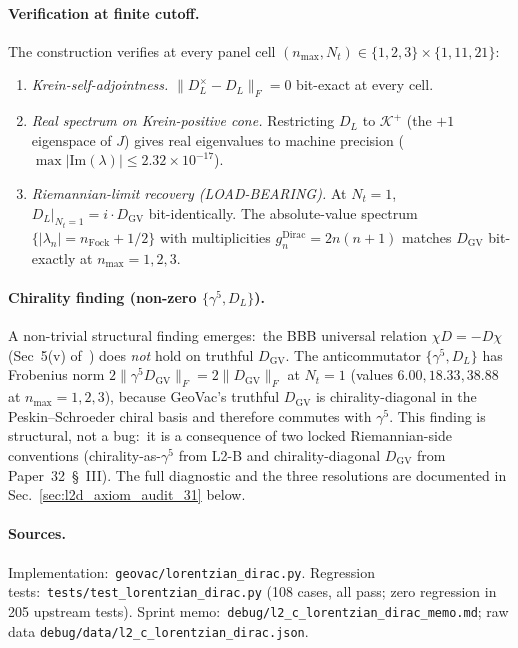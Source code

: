 \documentclass[11pt]{article}
\begin{document}
\paragraph{Verification at finite cutoff.}
The construction verifies at every panel cell $(n_{\max}, N_t) \in
\{1, 2, 3\} \times \{1, 11, 21\}$:
\begin{enumerate}\setlength{\itemsep}{2pt}
\item \emph{Krein-self-adjointness.}  $\|D_L^\times - D_L\|_F = 0$
bit-exact at every cell.
\item \emph{Real spectrum on Krein-positive cone.}  Restricting $D_L$
to $\mathcal{K}^+$ (the $+1$ eigenspace of $J$) gives real eigenvalues
to machine precision ($\max |\mathrm{Im}(\lambda)| \le 2.32 \times
10^{-17}$).
\item \emph{Riemannian-limit recovery (LOAD-BEARING).}  At $N_t = 1$,
$D_L|_{N_t = 1} = i \cdot D_{\mathrm{GV}}$ bit-identically.  The
absolute-value spectrum $\{|\lambda_n| = n_{\mathrm{Fock}} + 1/2\}$
with multiplicities $g_n^{\mathrm{Dirac}} = 2 n (n+1)$ matches
$D_{\mathrm{GV}}$ bit-exactly at $n_{\max} = 1, 2, 3$.
\end{enumerate}

\paragraph{Chirality finding (non-zero $\{\gamma^5, D_L\}$).}
A non-trivial structural finding emerges:\ the BBB universal
relation $\chi D = -D\chi$ (Sec~5(v) of~\cite{bizi_brouder_besnard2018})
does \emph{not} hold on truthful $D_{\mathrm{GV}}$.  The
anticommutator $\{\gamma^5, D_L\}$ has Frobenius norm
$2 \|\gamma^5 D_{\mathrm{GV}}\|_F = 2 \|D_{\mathrm{GV}}\|_F$ at
$N_t = 1$ (values $6.00, 18.33, 38.88$ at $n_{\max} = 1, 2, 3$),
because GeoVac's truthful $D_{\mathrm{GV}}$ is chirality-diagonal in
the Peskin--Schroeder chiral basis and therefore commutes with
$\gamma^5$.  This finding is structural, not a bug:\ it is a
consequence of two locked Riemannian-side conventions (chirality-as-$\gamma^5$
from L2-B and chirality-diagonal $D_{\mathrm{GV}}$ from Paper~32~\S~III).
The full diagnostic and the three resolutions are documented in
Sec.~\ref{sec:l2d_axiom_audit_31} below.

\paragraph{Sources.}
Implementation:\ \verb|geovac/lorentzian_dirac.py|.  Regression tests:\
\verb|tests/test_lorentzian_dirac.py| (108 cases, all pass;
zero regression in 205 upstream tests).  Sprint memo:\
\verb|debug/l2_c_lorentzian_dirac_memo.md|; raw data
\verb|debug/data/l2_c_lorentzian_dirac.json|.
\end{document}
